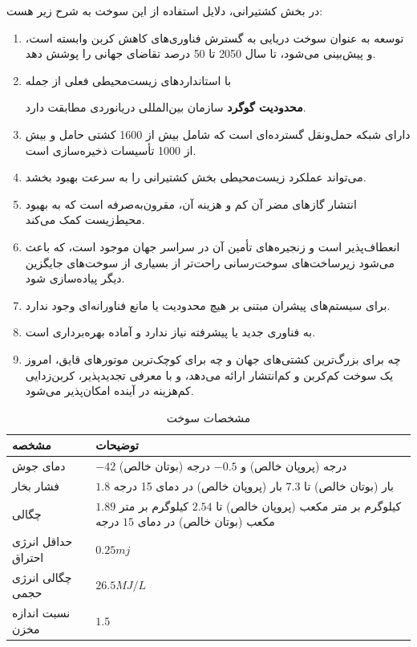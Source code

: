 در بخش کشتیرانی،
دلایل استفاده از این سوخت به شرح زیر هست:
\begin{enumerate}
	\item 
	توسعه 
	 به عنوان سوخت دریایی به گسترش فناوری‌های کاهش کربن وابسته است، و پیش‌بینی می‌شود،
	  تا سال 2050 تا 50 درصد تقاضای جهانی را پوشش دهد.
	\item 
	 با استانداردهای زیست‌محیطی فعلی از جمله 
	
	 \textbf{محدودیت گوگرد} سازمان بین‌المللی دریانوردی 
	  مطابقت دارد.
	\item 
	دارای شبکه حمل‌ونقل گسترده‌ای است که شامل بیش از 1600 کشتی حامل 
	 و بیش از 1000 تأسیسات ذخیره‌سازی است.
	\item  
	می‌تواند عملکرد زیست‌محیطی بخش کشتیرانی را به سرعت بهبود بخشد.
	\item 
	انتشار گازهای مضر آن کم و هزینه آن، مقرون‌به‌صرفه است که به بهبود محیط‌زیست کمک می‌کند.
	\item 
	 انعطاف‌پذیر است و زنجیره‌های تأمین آن در سراسر جهان موجود است، که باعث می‌شود زیرساخت‌های سوخت‌رسانی راحت‌تر از بسیاری از سوخت‌های جایگزین دیگر پیاده‌سازی شود.
	 \item 
	 برای سیستم‌های پیشران مبتنی بر
هیچ محدودیت یا مانع فناورانه‌ای وجود ندارد.
	 \item	
	  به فناوری جدید یا پیشرفته نیاز ندارد و آماده بهره‌برداری است.
	 \item 
	 چه برای بزرگ‌ترین کشتی‌های جهان و چه برای کوچک‌ترین موتورهای قایق،
	  امروز یک سوخت کم‌کربن و کم‌انتشار ارائه می‌دهد، و با معرفی 
	  تجدیدپذیر، کربن‌زدایی کم‌هزینه در آینده امکان‌پذیر می‌شود.
\end{enumerate}
	 
\newpage

\begin{table}[h!]
	\centering
	\caption{مشخصات سوخت }
	\label{dsd}
	\begin{tabular}{|m{2cm}|m{12cm}|}
		\hline
		\textbf{مشخصه} & \textbf{توضیحات} \\
		\hline
		دمای جوش   & $-42$ درجه (پروپان خالص) و $-0.5$ درجه (بوتان خالص) \\
		فشار بخار & $1.8$ بار (بوتان خالص) تا $7.3$ بار (پروپان خالص) در دمای 15 درجه\\
		 چگالی & $1.89$ کیلوگرم بر متر مکعب (پروپان خالص) تا $2.54$ کیلوگرم بر متر مکعب (بوتان خالص) در دمای $15$ ‌درجه \\
		حداقل انرژی احتراق & $ 0.25 mj$\\
		چگالی انرژی حجمی &  $  26.5MJ/L $   \\
		نسبت اندازه مخزن & $1.5$  \\
		\hline
	\end{tabular}
\end{table}


